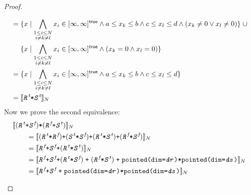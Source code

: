\documentclass{article}
\theoremstyle{definition}
\theoremstyle{plain}
\newcommand{\interp}[1]{\llbracket#1\rrbracket}
\newcommand{\interv}[3]{\textnormal{$\lbrack#1,#2\rbrack^{#3}$}}
\newcommand{\textcap}[1]{\texttt{\textit{#1}}}
\begin{document}
\begin{proof}
\begin{description}
\begin{align*}
        & = \{ x \mid
            \bigwedge_{\substack{1 \leq i \leq N \\ i \neq k \neq l}} x_i \in
              \interv{\infty}{\infty}{\textsf{true}}
            \wedge a \leq x_k \leq b
          \wedge c \leq x_l \leq d \wedge {(x_k \neq 0 \vee x_l \neq 0)} \}
          \;\cup \\
        & \quad\,\, \{ x \mid
            \bigwedge_{\substack{1 \leq i \leq N \\ i \neq k \neq l}} x_i \in
              \interv{\infty}{\infty}{\textsf{true}}
            \wedge (x_k = 0 \wedge x_l = 0) \} \\
        & = \{ x \mid
            \bigwedge_{\substack{1 \leq i \leq N \\ i \neq k \neq l}} x_i \in
              \interv{\infty}{\infty}{\textsf{true}}
            \wedge a \leq x_k \leq b
            \wedge c \leq x_l \leq d \} \\
        & = \interp{\textcap{R}^{\textit{t}} \texttt{*} \textcap{S}^{\textit{t}}}_N
      \end{align*}
%
      Now we prove the second equivalence:
      \begin{align*}
        \hspace{2em}&\hspace{-2em} \interp{
          (\textcap{R}^{\textit{t}} \texttt{+} \textcap{S}^{\textit{f}})
          \texttt{*}
          (\textcap{R}^{\textit{f}} \texttt{+} \textcap{S}^{\textit{t}})
        }_N \\
        &= \interp{
             (\textcap{R}^{\textit{t}} \texttt{*} \textcap{R}^{\textit{f}})
             \texttt{+}
             (\textcap{S}^{\textit{t}} \texttt{*} \textcap{S}^{\textit{f}})
             \texttt{+}
             (\textcap{R}^{\textit{t}} \texttt{*} \textcap{S}^{\textit{t}})
             \texttt{+}
             (\textcap{R}^{\textit{f}} \texttt{*} \textcap{S}^{\textit{f}})
           }_N \\
        &= \interp{
             \textcap{R}^{\textit{f}}
             \texttt{+}
             \textcap{S}^{\textit{f}}
             \texttt{+}
             (\textcap{R}^{\textit{t}} \texttt{*} \textcap{S}^{\textit{t}})
           }_N \\
        &= \interp
             {\textcap{R}^{\textit{f}}
              \texttt{+}
              \textcap{S}^{\textit{f}}
              \texttt{+}
              {(\textcap{R}^{\textit{t}} \texttt{*} \textcap{S}^{\textit{f}})}
               \;\texttt{+}\;
               {(\textcap{R}^{\textit{f}} \texttt{*} \textcap{S}^{\textit{t}})}
               \;\texttt{+}\;
               \texttt{pointed(dim=\textcap{dr})*pointed(dim=\textcap{ds})}}_N \\
        &= \interp{\textcap{R}^{\textit{f}} \texttt{+} \textcap{S}^{\textit{f}}
                   \;\texttt{+}\;
                   \texttt{pointed(dim=\textcap{dr})*pointed(dim=\textcap{ds})}}_N
      \end{align*}
  \end{description}
\end{proof}
\end{document}
